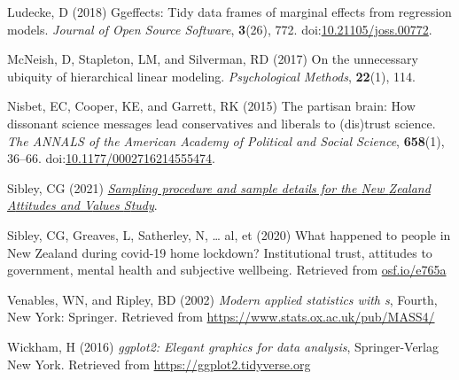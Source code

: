 \documentclass[
  single column]{article}
\newlength{\cslhangindent}
\newenvironment{CSLReferences}[2] %
 {\begin{list}{}{%
  \setlength{\itemindent}{0pt}
  \setlength{\leftmargin}{0pt}
  \setlength{\parsep}{0pt}
  \ifodd #1
   \setlength{\leftmargin}{\cslhangindent}
   \setlength{\itemindent}{-1\cslhangindent}
  \fi
  \setlength{\itemsep}{#2\baselineskip}}}
 {\end{list}}
\begin{document}
\begin{CSLReferences}{1}{0}
Ludecke, D (2018) Ggeffects: Tidy data frames of marginal effects from
regression models. \emph{Journal of Open Source Software},
\textbf{3}(26), 772.
doi:\href{https://doi.org/10.21105/joss.00772}{10.21105/joss.00772}.

McNeish, D, Stapleton, LM, and Silverman, RD (2017) On the unnecessary
ubiquity of hierarchical linear modeling. \emph{Psychological Methods},
\textbf{22}(1), 114.

Nisbet, EC, Cooper, KE, and Garrett, RK (2015) The partisan brain: How
dissonant science messages lead conservatives and liberals to (dis)trust
science. \emph{The ANNALS of the American Academy of Political and
Social Science}, \textbf{658}(1), 36--66.
doi:\href{https://doi.org/10.1177/0002716214555474}{10.1177/0002716214555474}.

Sibley, CG (2021)
\emph{\href{https://doi.org/10.31234/osf.io/wgqvy}{Sampling procedure
and sample details for the {N}ew {Z}ealand {A}ttitudes and {V}alues
{S}tudy}}.

Sibley, CG, Greaves, L, Satherley, N, \ldots{} al, et (2020) What
happened to people in {N}ew {Z}ealand during covid-19 home lockdown?
Institutional trust, attitudes to government, mental health and
subjective wellbeing. Retrieved from
\href{https://osf.io/e765a}{osf.io/e765a}

Venables, WN, and Ripley, BD (2002) \emph{Modern applied statistics with
s}, Fourth, New York: Springer. Retrieved from
\url{https://www.stats.ox.ac.uk/pub/MASS4/}

Wickham, H (2016) \emph{ggplot2: Elegant graphics for data analysis},
Springer-Verlag New York. Retrieved from
\url{https://ggplot2.tidyverse.org}

\end{CSLReferences}
\end{document}
